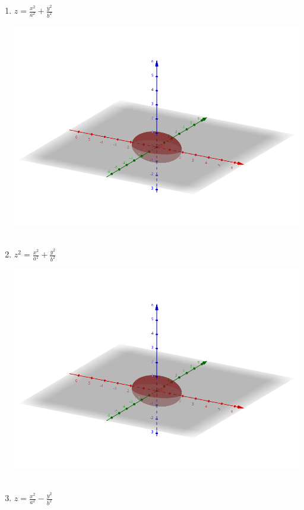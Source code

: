 \documentclass[../practica_02.tex]{subfiles}
\begin{document}
\begin{enumerate}
\begin{enumerate}
                \item $z = \frac{x^2}{a^2} + \frac{y^2}{b^2}$

                    \includegraphics[scale=0.4]{ej07/resources/2a.png} $ $

                \item $z^{2} = \frac{x^2}{a^2} + \frac{y^2}{b^2}$

                    \includegraphics[scale=0.4]{ej07/resources/2a.png} $ $

                \item $z = \frac{x^2}{a^2} - \frac{y^2}{b^2}$


\end{enumerate}
\end{enumerate}
\end{document}
